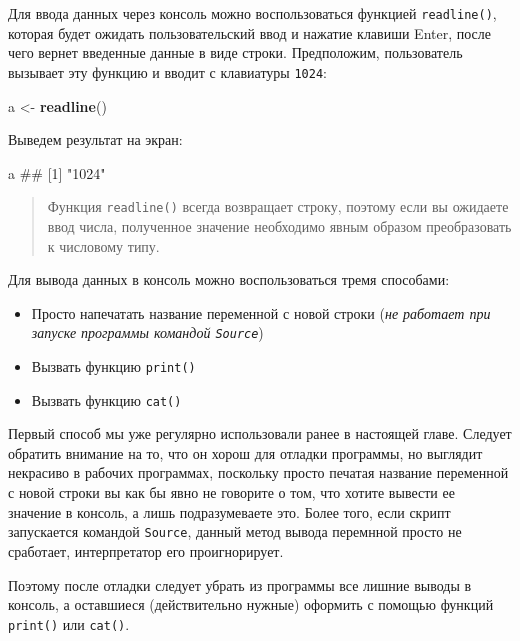 \documentclass[]{book}
\newenvironment{Shaded}{\begin{snugshade}}{\end{snugshade}}
\newcommand{\KeywordTok}[1]{\textcolor[rgb]{0.13,0.29,0.53}{\textbf{#1}}}
\newcommand{\StringTok}[1]{\textcolor[rgb]{0.31,0.60,0.02}{#1}}
\newcommand{\NormalTok}[1]{#1}
\providecommand{\tightlist}{%
  \setlength{\itemsep}{0pt}\setlength{\parskip}{0pt}}
\begin{document}
Для ввода данных через консоль можно воспользоваться функцией
\texttt{readline()}, которая будет ожидать пользовательский ввод и
нажатие клавиши Enter, после чего вернет введенные данные в виде строки.
Предположим, пользователь вызывает эту функцию и вводит с клавиатуры
\texttt{1024}:

\begin{Shaded}
\begin{Highlighting}[]
\NormalTok{a <-}\StringTok{ }\KeywordTok{readline}\NormalTok{()}
\end{Highlighting}
\end{Shaded}

Выведем результат на экран:

\begin{Shaded}
\begin{Highlighting}[]
\NormalTok{a}
\NormalTok{## [1] "1024"}
\end{Highlighting}
\end{Shaded}

\begin{quote}
Функция \texttt{readline()} всегда возвращает строку, поэтому если вы
ожидаете ввод числа, полученное значение необходимо явным образом
преобразовать к числовому типу.
\end{quote}

Для вывода данных в консоль можно воспользоваться тремя способами:

\begin{itemize}
\tightlist
\item
  Просто напечатать название переменной с новой строки (\emph{не
  работает при запуске программы командой \texttt{Source}})
\item
  Вызвать функцию \texttt{print()}
\item
  Вызвать функцию \texttt{cat()}
\end{itemize}

Первый способ мы уже регулярно использовали ранее в настоящей главе.
Следует обратить внимание на то, что он хорош для отладки программы, но
выглядит некрасиво в рабочих программах, поскольку просто печатая
название переменной с новой строки вы как бы явно не говорите о том, что
хотите вывести ее значение в консоль, а лишь подразумеваете это. Более
того, если скрипт запускается командой \texttt{Source}, данный метод
вывода перемнной просто не сработает, интерпретатор его проигнорирует.

Поэтому после отладки следует убрать из программы все лишние выводы в
консоль, а оставшиеся (действительно нужные) оформить с помощью функций
\texttt{print()} или \texttt{cat()}.
\end{document}
